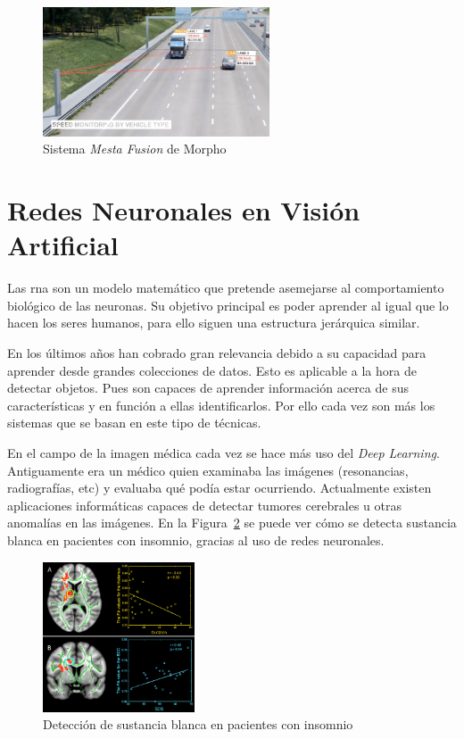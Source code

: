 \begin{figure}[H]
  \begin{center}
    \includegraphics[width=0.6\textwidth]{figures/Introduccion/mesta_fusion.jpg}
		\caption{Sistema \textit{Mesta Fusion} de Morpho}
		\label{fig.mesta_fusion}
		\end{center}
\end{figure}

\section{Redes Neuronales en Visión Artificial}

Las \acrfull{rna} son un modelo matemático que pretende asemejarse al comportamiento biológico de las neuronas. Su objetivo principal es poder aprender al igual que lo hacen los seres humanos, para ello siguen una estructura jerárquica similar.

En los últimos años han cobrado gran relevancia debido a su capacidad para aprender desde grandes colecciones de datos. Esto es aplicable a la hora de detectar objetos. Pues son capaces de aprender información acerca de sus características y en función a ellas identificarlos. Por ello cada vez son más los sistemas que se basan en este tipo de técnicas. 

En el campo de la imagen médica cada vez se hace más uso del \textit{Deep Learning}. Antiguamente era un médico quien examinaba las imágenes (resonancias, radiografías, etc) y evaluaba qué podía estar ocurriendo. Actualmente existen aplicaciones informáticas capaces de detectar tumores cerebrales u otras anomalías en las imágenes. En la Figura~\ref{fig.imagen_medica} se puede ver cómo se detecta sustancia blanca en pacientes con insomnio, gracias al uso de redes neuronales.

\begin{figure}[H]
  \begin{center}
    \includegraphics[width=0.4\textwidth]{figures/Introduccion/imagen_medica.jpg}
		\caption{Detección de sustancia blanca en pacientes con insomnio}
		\label{fig.imagen_medica}
		\end{center}
\end{figure}

